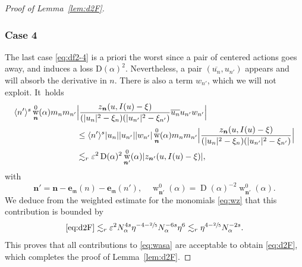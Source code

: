 \documentclass[10pt,a4paper]{amsart}
\DeclareMathOperator{\rw}{w}
\theoremstyle{plain}
\theoremstyle{definition}
\newcommand{\nb}{{\boldsymbol n}}
\newcommand{\1}{\mathbf{1}}
\let\epsilon\varepsilon
\begin{document}
\begin{proof}[Proof of Lemma~\ref{lem:d2F}]
\subsubsection*{Case 4}
The last case \eqref{eq:df2-4} is a priori the worst since a pair of centered actions goes away, and induces a loss $\mathrm{D}(\alpha)^{2}$. Nevertheless, a pair $(\overline{u_{n}},u_{n'})$ appears and will absorb the derivative in $n$. There is also a term $w_{n'}$, which we will not exploit. It~holds
\begin{align*}
\langle n'\rangle^{s}
\rw_{\nb}^{0}(\alpha)
m_nm_{n'}
&\Bigl|
\frac{z_{\nb}(u,I(u)-\xi)}
{(|u_{n}|^{2}-\xi_{n})(|u_{n'}|^{2}-\xi_{n'})}
\overline{u_{n}}u_{n'}w_{n'}
\Bigr| \\
&\leq
\langle n'\rangle^{s}|u_{n}||u_{n'}||w_{n'}|
\rw_{\nb}^{0}(\alpha)
m_nm_{n'}
\Bigl|
\frac{z_{\nb}(u,I(u)-\xi)}
{(|u_{n}|^{2}-\xi_{n})(|u_{n'}|^{2}-\xi_{n'})}
\Bigr| \\
&\lesssim_{r}
\epsilon^{2}
\operatorname{D}(\alpha)^{2}
\rw_{\nb'}^{0}(\alpha)
|z_{\nb'}(u,I(u)-\xi)|,
\end{align*}
with
\[
\nb' = \nb - \boldsymbol{e}_{\mathfrak{m}}(n)-\boldsymbol{e}_{\mathfrak{m}}(n'),\quad
\rw^{0}_{\nb'}(\alpha)
=\operatorname{D}(\alpha)^{-2}\rw_{\nb'}^{0}(\alpha).
\]
We deduce from the weighted estimate for the monomials \eqref{eq:wz} that this contribution is bounded by
\[
\eqref{eq:d2F}\lesssim_{r}
\epsilon^{2}
N_{\alpha}^{4s}\eta^{-4-\sfrac{2}{5}}
N_{\alpha}^{-6s}\eta^{6}
\lesssim_{r}\eta^{4-\sfrac{2}{5}}N_{\alpha}^{-2s}.
\]
This proves that all contributions to \eqref{eq:wasa} are acceptable to obtain \eqref{eq:d2F}, which completes the proof of Lemma~\ref{lem:d2F}.
\end{proof}
\end{document}
